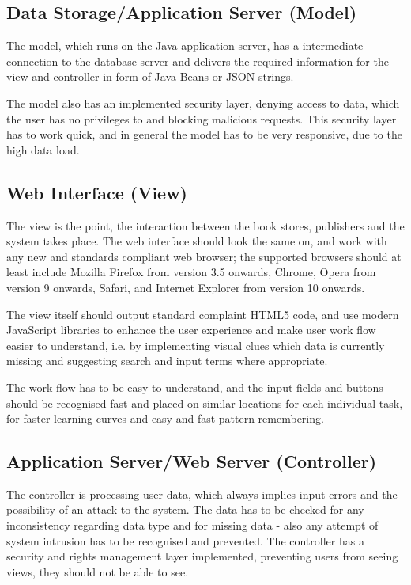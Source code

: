 \documentclass[11pt,a4paper,oneside,svgnames]{report}
\begin{document}
\subsection{Data Storage/Application Server (Model)}
The model, which runs on the Java application server, has a intermediate connection to the database server and delivers the required information for the view and controller in form of Java Beans or JSON strings.

The model also has an implemented security layer, denying access to data, which the user has no privileges to and blocking malicious requests. This security layer has to work quick, and in general the model has to be very responsive, due to the high data load.

\subsection{Web Interface (View)}
The view is the point, the interaction between the book stores, publishers and the system takes place. The web interface should look the same on, and work with any new and standards compliant web browser; the supported browsers should at least include Mozilla Firefox from version 3.5 onwards, Chrome, Opera from version 9 onwards, Safari, and Internet Explorer from version 10 onwards.

The view itself should output standard complaint HTML5 code, and use modern JavaScript libraries to enhance the user experience and make user work flow easier to understand, i.e. by implementing visual clues which data is currently missing and suggesting search and input terms where appropriate.

The work flow has to be easy to understand, and the input fields and buttons should be recognised fast and placed on similar locations for each individual task, for faster learning curves and easy and fast pattern remembering.

\subsection{Application Server/Web Server (Controller)}
The controller is processing user data, which always implies input errors and the possibility of an attack to the system. The data has to be checked for any inconsistency regarding data type and for missing data - also any attempt of system intrusion has to be recognised and prevented.
The controller has a security and rights management layer implemented, preventing users from seeing views, they should not be able to see.
\end{document}
